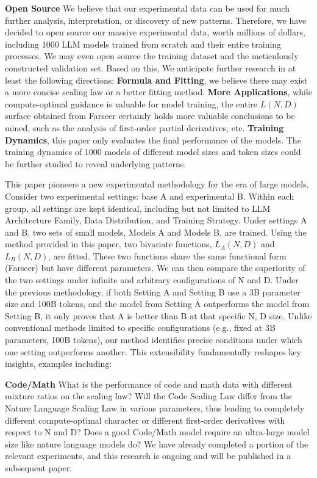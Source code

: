 \documentclass{article}
\begin{document}
\textbf{Open Source}
    We believe that our experimental data can be used for much further analysis, interpretation, or discovery of new patterns.
    Therefore, we have decided to open source our massive experimental data, worth millions of dollars, including 1000 LLM models trained from scratch and their entire training processes. 
    We may even open source the training dataset and the meticulously constructed validation set.
    Based on this, We anticipate further research in at least the following directions:
    \textbf{Formula and Fitting}, we believe there may exist a more concise scaling law or a better fitting method.
    \textbf{More Applications}, while compute-optimal guidance is valuable for model training, the entire $L(N,D)$ surface obtained from Farseer certainly holds more valuable conclusions to be mined, such as the analysis of first-order partial derivatives, etc.
    \textbf{Training Dynamics}, this paper only evaluates the final performance of the models. The training dynamics of 1000 models of different model sizes and token sizes could be further studied to reveal underlying patterns.

This paper pioneers a new experimental methodology for the era of large models. Consider two experimental settings: base A and experimental B. Within each group, all settings are kept identical, including but not limited to LLM Architecture Family, Data Distribution, and Training Strategy. Under settings A and B, two sets of small models, Models A and Models B, are trained. Using the method provided in this paper, two bivariate functions, $L_A(N,D)$ and $L_B(N,D)$, are fitted. These two functions share the same functional form (Farseer) but have different parameters. We can then compare the superiority of the two settings under infinite and arbitrary configurations of N and D.
Under the previous methodology, if both Setting A and Setting B use a 3B parameter size and 100B tokens, and the model from Setting A outperforms the model from Setting B, it only proves that A is better than B at that specific N, D size. 
Unlike conventional methods limited to specific configurations (e.g., fixed at 3B parameters, 100B tokens), our method identifies precise conditions under which one setting outperforms another.
This extensibility fundamentally reshapes key insights, examples including:

\textbf{Code/Math} What is the performance of code and math data with different mixture ratios on the scaling law? Will the Code Scaling Law differ from the Nature Language Scaling Law in various parameters, thus leading to completely different compute-optimal character or different first-order derivatives with respect to N and D? Does a good Code/Math model require an ultra-large model size like nature language models do? We have already completed a portion of the relevant experiments, and this research is ongoing and will be published in a subsequent paper.
\end{document}
